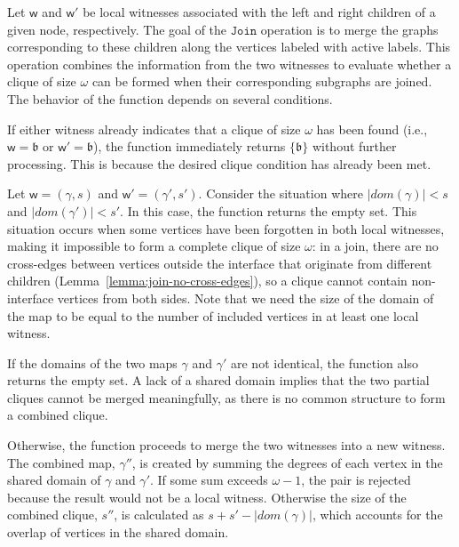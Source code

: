 \documentclass[11pt,a4paper]{article}
\newcommand{\joingenericcore}{\mathtt{Join}}
\newcommand{\awitness}{\mathsf{w}}
\newcommand{\domain}{dom}
\newcommand{\cliqueparameter}{\omega}
\newcommand{\cliquemap}{\gamma}
\newcommand{\cliquesize}{s}
\newcommand{\cliquefound}{\mathfrak{b}}
\begin{document}
{	%
	 Let $\awitness$ and $\awitness'$ be local witnesses associated with the left and right children of a given node, respectively. The goal of the $\joingenericcore$ operation is to merge the graphs corresponding to these children along the vertices labeled with active labels. This operation combines the information from the two witnesses to evaluate whether a clique of size \(\cliqueparameter\) can be formed when their corresponding subgraphs are joined. The behavior of the function depends on several conditions.

	If either witness already indicates that a clique of size \(\cliqueparameter\) has been found (i.e., \(\awitness = \cliquefound\) or \(\awitness' = \cliquefound\)), the function immediately returns \(\{\cliquefound\}\) without further processing. This is because the desired clique condition has already been met.

	Let $\awitness = (\cliquemap,\cliquesize)$ and $\awitness' = (\cliquemap',\cliquesize')$.
	Consider the situation where $|\domain(\cliquemap)| < \cliquesize$ and $|\domain(\cliquemap')| < \cliquesize'$. In this case, the function returns the empty set. This situation occurs when some vertices have been forgotten in both local witnesses, making it impossible to form a complete clique of size \(\cliqueparameter\): in a join, there are no cross-edges between vertices outside the interface that originate from different children (Lemma~\ref{lemma:join-no-cross-edges}), so a clique cannot contain non-interface vertices from both sides. Note that we need the size of the domain of the map to be equal to the number of included vertices in at least one local witness.

	If the domains of the two maps \(\cliquemap\) and \(\cliquemap'\) are not identical, the function also returns the empty set. A lack of a shared domain implies that the two partial cliques cannot be merged meaningfully, as there is no common structure to form a combined clique.

		Otherwise, the function proceeds to merge the two witnesses into a new witness. The combined map, \(\cliquemap''\), is created by summing the degrees of each vertex in the shared domain of \(\cliquemap\) and \(\cliquemap'\). If some sum exceeds \(\cliqueparameter-1\), the pair is rejected because the result would not be a local witness. Otherwise the size of the combined clique, \(\cliquesize''\), is calculated as \(\cliquesize + \cliquesize' - |\domain(\cliquemap)|\), which accounts for the overlap of vertices in the shared domain.

}
\end{document}
